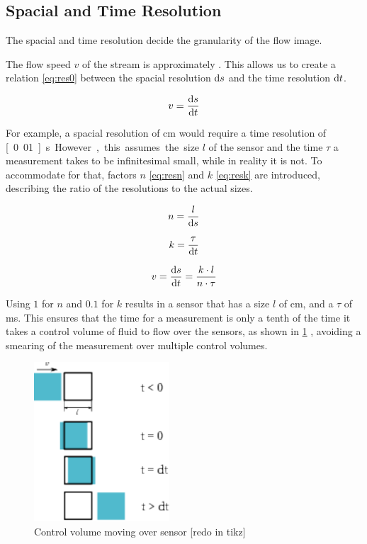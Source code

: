 \subsection{Spacial and Time Resolution}

The spacial and time resolution decide the granularity of the flow image.

The flow speed $ v $ of the stream is approximately . This allows us to create a relation \ref{eq:res0} between the spacial resolution $ \mathop{}\!\mathrm{d} s $ and the time resolution $ \mathop{}\!\mathrm{d} t $.

\begin{equation}
	v = \dfrac{\mathop{}\!\mathrm{d} s}{\mathop{}\!\mathrm{d} t}
\label{eq:res0} 
\end{equation}

For example, a spacial resolution of \unit[1]{cm} would require a time resolution of \unit[0.01]{s}. However, this assumes the size $ l $ of the sensor and the time $ \tau $ a measurement takes to be infinitesimal small, while in reality it is not. To accommodate for that, factors $ n $ \ref{eq:resn} and $ k $ \ref{eq:resk} are introduced, describing the ratio of the resolutions to the actual sizes.

\begin{equation}
	n = \dfrac{l}{\mathop{}\!\mathrm{d} s}
\label{eq:resn} 
\end{equation}

\begin{equation}
	k = \dfrac{ \tau}{\mathop{}\!\mathrm{d} t}
\label{eq:resk}
\end{equation}

\begin{equation}
	v = \dfrac{\mathop{}\!\mathrm{d} s}{\mathop{}\!\mathrm{d} t} = \dfrac{k \cdot l}{n \cdot \tau}
\label{eq:res1} 
\end{equation}

Using $ 1 $ for $ n $ and $ 0.1 $ for $ k $ results in a sensor that has a size $ l $ of \unit[1]{cm}, and a $ \tau $ of \unit[1]{ms}. This ensures that the time for a measurement is only a tenth of the time it takes a control volume of fluid to flow over the sensors, as shown in \ref{fig:cv} , avoiding a smearing of the measurement over multiple control volumes.

\begin{figure}
	\begin{center}
		\includegraphics[width=0.45\textwidth]{images/resolution.pdf} 
		\caption{Control volume moving over sensor [redo in tikz]}
		\label{fig:cv}
	\end{center}
\end{figure}


